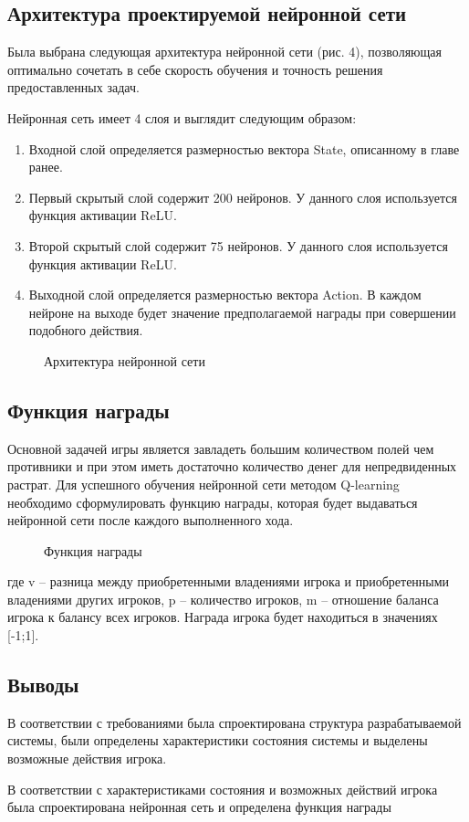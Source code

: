 \begin{Large}
\subsection{Архитектура проектируемой нейронной сети}
Была выбрана следующая архитектура нейронной сети (рис. 4), позволяющая оптимально сочетать в себе скорость обучения и точность решения предоставленных задач.

Нейронная сеть имеет 4 слоя и выглядит следующим образом:
\begin{spacing}{0.9}
\begin{enumerate}
    \item Входной слой определяется размерностью вектора State, описанному в главе ранее.
    \item Первый скрытый слой содержит 200 нейронов. У данного слоя используется функция активации ReLU.
    \item Второй скрытый слой содержит 75 нейронов. У данного слоя используется функция активации ReLU.
    \item Выходной слой определяется размерностью вектора Action. В каждом нейроне на выходе будет значение предполагаемой награды при совершении подобного действия.
\end{enumerate}
\end{spacing}
\newpage
\begin{figure}[h]
    \caption{Архитектура нейронной сети}
\end{figure}
\subsection{Функция награды}
Основной задачей игры является завладеть большим количеством полей чем противники и при этом иметь достаточно количество денег для непредвиденных растрат. Для успешного обучения нейронной сети методом Q-learning необходимо сформулировать функцию награды, которая будет выдаваться нейронной сети после каждого выполненного хода. 
\begin{figure}[h!]
    \caption{Функция награды}
\end{figure}

где v – разница между приобретенными владениями игрока и приобретенными владениями других игроков, p – количество игроков, m – отношение баланса игрока к балансу всех игроков. Награда игрока будет находиться в значениях [-1;1].
\subsection*{Выводы}
В соответствии с требованиями была спроектирована структура разрабатываемой системы, были определены характеристики состояния системы и выделены возможные действия игрока. 

В соответствии с характеристиками состояния и возможных действий игрока была спроектирована нейронная сеть и определена функция награды 
\end{Large}
